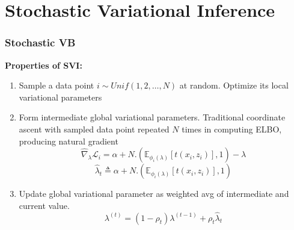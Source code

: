 \documentclass{beamer}
\newcommand{\E}{\mathbb{E}}
\renewcommand{\L}{\mathcal{L}}
\begin{document}
\section{Stochastic Variational Inference}
\begin{frame}
\frametitle{Stochastic VB}
\textbf{Properties of SVI:}
\begin{enumerate}
\item Sample a data point $i\sim Unif(1,2,\ldots,N)$ at random. Optimize its local variational parameters
\item Form intermediate global variational parameters. Traditional coordinate ascent with sampled data point repeated $N$ times in computing ELBO, producing natural gradient
\[
\hat\nabla_\lambda\L_i = \alpha + N.(\E_{\phi_i(\lambda)}[t(x_i,z_i)],1)-\lambda
\]
\begin{equation}
\label{eq:svi1}
\hat{\lambda}_t \triangleq \alpha + N.(\E_{\phi_i(\lambda)}[t(x_i,z_i)],1)
\end{equation}
\item Update global variational parameter as weighted avg of intermediate and current value.
\begin{equation}
\label{eq:svi2}
\lambda^{(t)}=(1-\rho_t)\lambda^{(t-1)}+\rho_t\hat{\lambda}_t
\end{equation}

\end{enumerate}
\end{frame}

\end{document}
